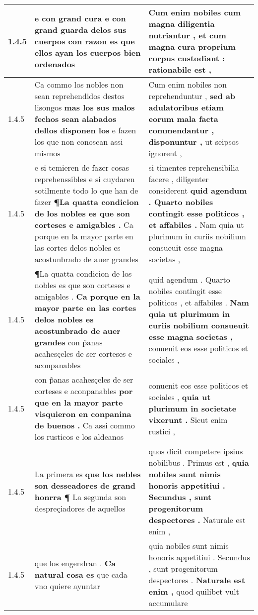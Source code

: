 \begin{tabular}{|p{1cm}|p{6.5cm}|p{6.5cm}|}
1.4.5 & e con grand cura \textbf{ e con grand guarda delos sus cuerpos } con razon es que ellos ayan los cuerpos bien ordenados & Cum enim nobiles cum magna diligentia nutriantur , \textbf{ et cum magna cura proprium corpus custodiant : } rationabile est , \\\hline
1.4.5 & Ca commo los nobles non sean reprehendidos destos lisongos \textbf{ mas los sus malos fechos sean alabados dellos disponen los } e fazen los que non conoscan assi mismos & Cum enim nobiles non reprehenduntur , \textbf{ sed ab adulatoribus etiam eorum mala facta commendantur , disponuntur , } ut seipsos ignorent , \\\hline
1.4.5 & e si temieren de fazer cosas reprehenssibles e si cuydaren sotilmente todo lo que han de fazer \textbf{ ¶La quatta condicion de los nobles es que son corteses e amigables . } Ca porque en la mayor parte en las cortes delos nobles es acostunbrado de auer grandes & si timentes reprehensibilia facere , diligenter considerent \textbf{ quid agendum . Quarto nobiles contingit esse politicos , et affabiles . } Nam quia ut plurimum in curiis nobilium consueuit esse magna societas , \\\hline
1.4.5 & ¶La quatta condicion de los nobles es que son corteses e amigables . \textbf{ Ca porque en la mayor parte en las cortes delos nobles es acostunbrado de auer grandes } con p̃anas acahesçeles de ser corteses e aconpanables & quid agendum . Quarto nobiles contingit esse politicos , et affabiles . \textbf{ Nam quia ut plurimum in curiis nobilium consueuit esse magna societas , } conuenit eos esse politicos et sociales , \\\hline
1.4.5 & con p̃anas acahesçeles de ser corteses e aconpanables \textbf{ por que en la mayor parte visquieron en conpanina de buenos . } Ca assi commo los rusticos e los aldeanos & conuenit eos esse politicos et sociales , \textbf{ quia ut plurimum in societate vixerunt . } Sicut enim rustici , \\\hline
1.4.5 & La primera es \textbf{ que los nebles son desseadores de grand honrra ¶ } La segunda son despreçiadores de aquellos & quos dicit competere ipsius nobilibus . Primus est , \textbf{ quia nobiles sunt nimis honoris appetitiui . Secundus , sunt progenitorum despectores . } Naturale est enim , \\\hline
1.4.5 & que los engendran . \textbf{ Ca natural cosa es } que cada vno quiere ayuntar & quia nobiles sunt nimis honoris appetitiui . Secundus , sunt progenitorum despectores . \textbf{ Naturale est enim , } quod quilibet vult accumulare \\\hline

\end{tabular}
